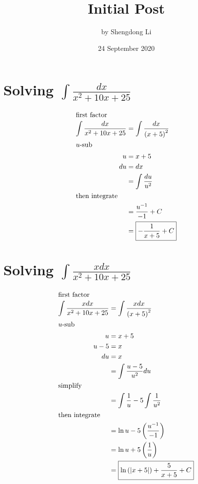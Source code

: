 \documentclass[12pt]{article}
\begin{document}
\title{Initial Post}
\author{by Shengdong Li}
\date{24 September 2020}
\maketitle

\section{Solving $\int\frac{dx}{x^2+10x+25}$}

\begin{align}
  \intertext{first factor}
  \int\frac{dx}{x^2+10x+25}
     & =\int\frac{dx}{\left(x+5\right)^2} \\
  \intertext{$u$-sub}
  u  & = x+5                              \\
  du & = dx                               \\
     & =\int\frac{du}{u^2}                \\
  \intertext{then integrate}
     & =\frac{u^{-1}}{-1}+C               \\
     & =\boxed{-\frac{1}{x+5}+C}
\end{align}

\setcounter{equation}{0}

\section{Solving $\int\frac{xdx}{x^2+10x+25}$}
\begin{align}
  \intertext{first factor}
  \int\frac{xdx}{x^2+10x+25} & =\int\frac{xdx}{\left(x+5\right)^2}                             \\
  \intertext{$u$-sub}
  u                          & =x+5                                                            \\
  u-5                        & =x                                                              \\
  du                         & = x                                                             \\
                             & = \int\frac{u-5}{u^2}du                                         \\
  \intertext{simplify}
                             & = \int\frac{1}{u}-5\int\frac{1}{u^2}                            \\
  \intertext{then integrate}
                             & = \ln{u} - 5\left(\frac{u^{-1}}{-1}\right)                      \\
                             & = \ln{u} + 5\left(\frac{1}{u}\right)                            \\
                             & = \boxed{\ln{\left(\left|x+5\right|\right)} + \frac{5}{x+5} +C}
\end{align}
\end{document}
